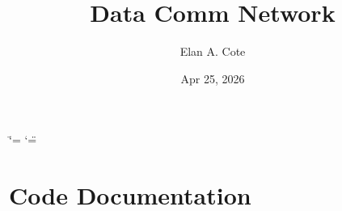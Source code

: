\documentclass[letterpaper,10pt,english]{sphinxmanual}
\title{Data Comm Network}
\date{Apr 25, 2026}
\author{Elan A.\@{} Cote}
\begin{document}
\ifdefined\shorthandoff
  \ifnum\catcode`\=\string=\active\shorthandoff{=}\fi
  \ifnum\catcode`\"=\active{}\fi
\fi

\pagestyle{empty}
\sphinxmaketitle
\pagestyle{plain}
\sphinxtableofcontents
\pagestyle{normal}
\label{\detokenize{index::doc}}


\sphinxstepscope


\chapter{Code Documentation}
\label{\detokenize{modules:code-documentation}}\label{\detokenize{modules::doc}}


\renewcommand{\indexname}{Index}
\printindex
\end{document}
